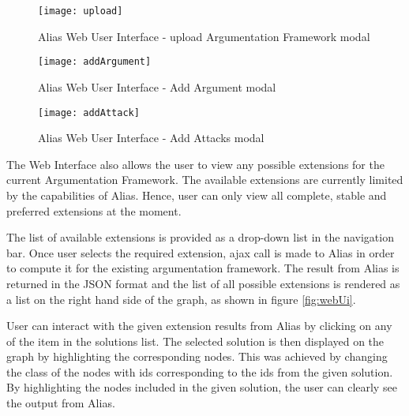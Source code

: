 \begin{figure}
	\centering
	\texttt{[image: upload]}
	\caption{Alias Web User Interface - upload Argumentation Framework modal}
	\label{fig:upload}
\end{figure}

\begin{figure}
	\centering
	\texttt{[image: addArgument]}
	\caption{Alias Web User Interface - Add Argument modal}
	\label{fig:addArgument}
\end{figure}

\begin{figure}
	\centering
	\texttt{[image: addAttack]}
	\caption{Alias Web User Interface - Add Attacks modal}
	\label{fig:addAttacks}
\end{figure}

The Web Interface also allows the user to view any possible extensions for the current Argumentation Framework. The available extensions are currently limited by the capabilities of Alias. Hence, user can only view all complete, stable and preferred extensions at the moment. 

The list of available extensions is provided as a drop-down list in the navigation bar. Once user selects the required extension, ajax call is made to Alias in order to compute it for the existing argumentation framework. The result from Alias is returned in the JSON format and the list of all possible extensions is rendered as a list on the right hand side of the graph, as shown in figure \ref{fig:webUi}.

User can interact with the given extension results from Alias by clicking on any of the item in the solutions list. The selected solution is then displayed on the graph by highlighting the corresponding nodes. This was achieved by changing the class of the nodes with ids corresponding to the ids from the given solution. By highlighting the nodes included in the given solution, the user can clearly see the output from Alias.